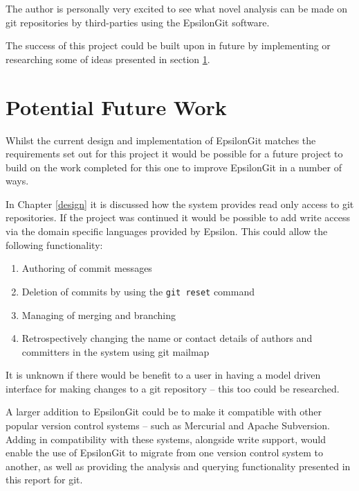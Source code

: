 \documentclass[11pt]{book}
\newcommand{\code}[1]{\texttt{#1}}
\begin{document}
The author is personally very excited to see what novel analysis can be made on git repositories by third-parties using the EpsilonGit software.

The success of this project could be built upon in future by implementing or researching some of ideas presented in section \ref{potentialfuturework}.

\section{Potential Future Work}
\label{potentialfuturework}
Whilst the current design and implementation of EpsilonGit matches the requirements set out for this project it would be possible for a future project to build on the work completed for this one to improve EpsilonGit in a number of ways. 

In Chapter \ref{design} it is discussed how the system provides read only access to git repositories. If the project was continued it would be possible to add write access via the domain specific languages provided by Epsilon. This could allow the following functionality:

\begin{enumerate}
	\item Authoring of commit messages
	\item Deletion of commits by using the \code{git reset} command \cite{gitreset}
	\item Managing of merging and branching
	\item Retrospectively changing the name or contact details of authors and committers in the system using git mailmap \cite{gitmailmap}
\end{enumerate} 

It is unknown if there would be benefit to a user in having a model driven interface for making changes to a git repository -- this too could be researched. 

A larger addition to EpsilonGit could be to make it compatible with other popular version control systems -- such as Mercurial and Apache Subversion. Adding in compatibility with these systems, alongside write support, would enable the use of EpsilonGit to migrate from one version control system to another, as well as providing the analysis and querying functionality presented in this report for git.
\end{document}
